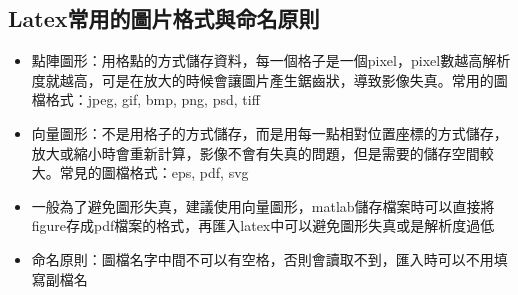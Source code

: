 \documentclass[12pt,a4paper]{report}
\begin{document}
\begin{CJK}{UTF8}{bkai}
\section{Latex常用的圖片格式與命名原則}

\begin{itemize}
\item 點陣圖形：用格點的方式儲存資料，每一個格子是一個pixel，pixel數越高解析度就越高，可是在放大的時候會讓圖片產生鋸齒狀，導致影像失真。常用的圖檔格式：jpeg, gif, bmp, png, psd, tiff
\item 向量圖形：不是用格子的方式儲存，而是用每一點相對位置座標的方式儲存，放大或縮小時會重新計算，影像不會有失真的問題，但是需要的儲存空間較大。常見的圖檔格式：eps, pdf, svg
\item 一般為了避免圖形失真，建議使用向量圖形，matlab儲存檔案時可以直接將figure存成pdf檔案的格式，再匯入latex中可以避免圖形失真或是解析度過低
\item 命名原則：圖檔名字中間不可以有空格，否則會讀取不到，匯入時可以不用填寫副檔名
\end{itemize}

\newpage

\end{CJK}
\end{document}
